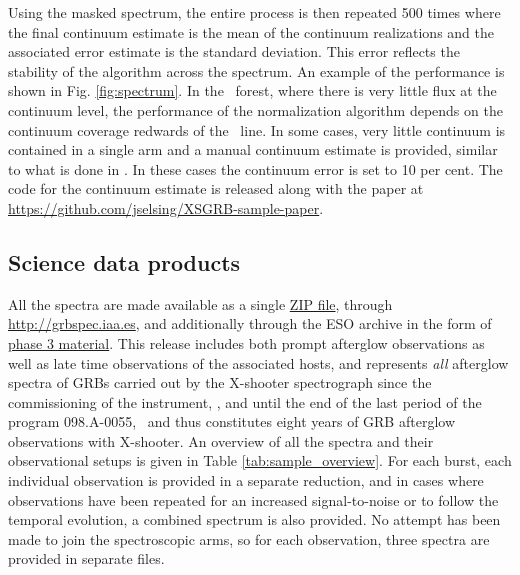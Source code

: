 \documentclass{aa}    %
\begin{document}
Using the masked spectrum, the entire process is then repeated 500 times where
the final continuum estimate is the mean of the continuum realizations and the
associated error estimate is the standard deviation. This error reflects the
stability of the algorithm across the spectrum. An example of the performance is
shown in Fig. \ref{fig:spectrum}. In the \lya~forest, where there is very little
flux at the continuum level, the performance of the normalization algorithm
depends on the continuum coverage redwards of the \lya~line. In some cases, very
little continuum is contained in a single arm and a manual continuum estimate is
provided, similar to what is done in \citet{Lopez2016}. In these cases the
continuum error is set to 10 per cent. The code for the continuum estimate is
released along with the paper at
\url{https://github.com/jselsing/XSGRB-sample-paper}.
                                                                                           

\subsection{Science data products} \label{products}


All the spectra are made available as a single
\href{http://www.dark-cosmology.dk/~jselsing/XSGRB}{ZIP file}, through
\url{http://grbspec.iaa.es}, and additionally through the ESO archive in the
form of \href{http://archive.eso.org/wdb/wdb/adp/phase3_main/form}{phase 3
	material}. This release includes both prompt afterglow observations as well as
late time observations of the associated hosts, and represents \textit{all}
afterglow spectra of GRBs carried out by the X-shooter spectrograph since the
commissioning of the instrument, \startdate, and until the end of the last
period of the program 098.A-0055, \termdate~and thus constitutes eight years of GRB
afterglow observations with X-shooter. An overview of all the spectra and their
observational setups is given in Table \ref{tab:sample_overview}. For each
burst, each individual observation is provided in a separate reduction, and in
cases where observations have been repeated for an increased signal-to-noise or
to follow the temporal evolution, a combined spectrum is also provided. No
attempt has been made to join the spectroscopic arms, so for each observation,
three spectra are provided in separate files.
\end{document}
